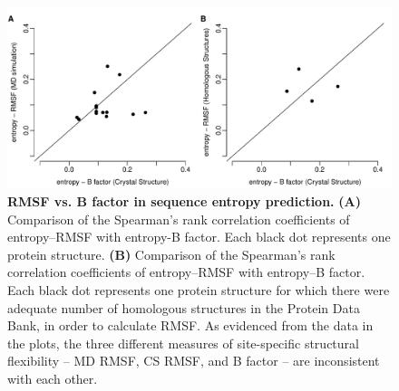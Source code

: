 \documentclass[12pt]{article}
\begin{document}
            \begin{figure}[t]
            \begin{center}
                \includegraphics[height=0.35\textheight]{cor_entropy_bfca_rmsf.pdf}
            \end{center}
            \caption{
                     {\bf RMSF vs. B factor in sequence entropy prediction.} {\bf (A)} Comparison of the Spearman's rank correlation coefficients of entropy--RMSF with entropy-B factor. Each black dot represents one protein structure. {\bf (B)} Comparison of the Spearman's rank correlation coefficients of entropy--RMSF with entropy--B factor. Each black dot represents one protein structure for which there were adequate number of homologous structures in the Protein Data Bank, in order to calculate RMSF. As evidenced from the data in the plots, the three different measures of site-specific structural flexibility -- MD RMSF, CS RMSF, and B factor -- are inconsistent with each other.
                     }
            \label{fig:cor_entropy_bfca_rmsf}
            \end{figure}
\end{document}
